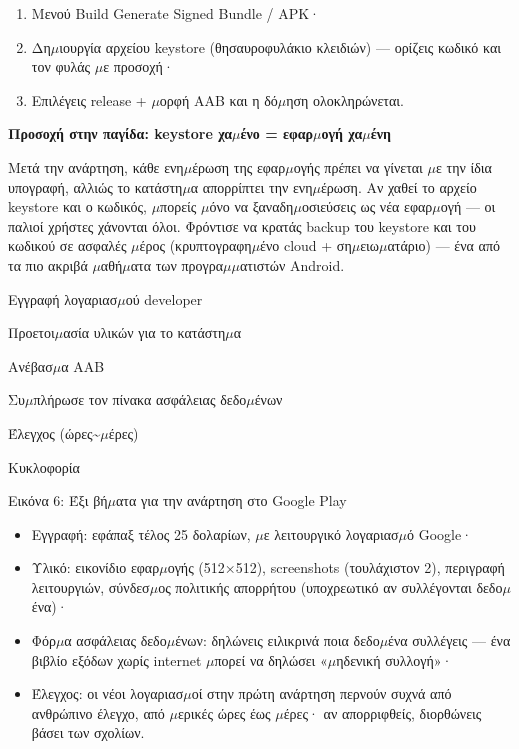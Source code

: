 \begin{enumerate}
  \item Μενού Build Generate Signed Bundle / APK·
  \item Δη$\mu$ιουργία αρχείου keystore (θησαυροφυλάκιο κλειδιών) — ορίζεις κωδικό και τον φυλάς $\mu$ε προσοχή·
  \item Επιλέγεις release + $\mu$ορφή AAB και η δό$\mu$ηση ολοκληρώνεται.
\end{enumerate}

\textbf{Προσοχή στην παγίδα: keystore χα$\mu$ένο = εφαρ$\mu$ογή χα$\mu$ένη}\par

Μετά την ανάρτηση, κάθε ενη$\mu$έρωση της εφαρ$\mu$ογής πρέπει να γίνεται $\mu$ε την ίδια υπογραφή, αλλιώς το κατάστη$\mu$α απορρίπτει την ενη$\mu$έρωση. Αν χαθεί το αρχείο keystore και ο κωδικός, $\mu$πορείς $\mu$όνο να ξαναδη$\mu$οσιεύσεις ως νέα εφαρ$\mu$ογή — οι παλιοί χρήστες χάνονται όλοι. Φρόντισε να κρατάς backup του keystore και του κωδικού σε ασφαλές $\mu$έρος (κρυπτογραφη$\mu$ένο cloud + ση$\mu$ειω$\mu$ατάριο) — ένα από τα πιο ακριβά $\mu$αθή$\mu$ατα των προγρα$\mu$$\mu$ατιστών Android.


Εγγραφή λογαριασ$\mu$ού developer

Προετοι$\mu$ασία υλικών για το κατάστη$\mu$α

Ανέβασ$\mu$α AAB

Συ$\mu$πλήρωσε τον πίνακα ασφάλειας δεδο$\mu$ένων

Έλεγχος (ώρες\textasciitilde{}$\mu$έρες)

Κυκλοφορία

\begin{center}\small\color{gray}Εικόνα 6: Έξι βή$\mu$ατα για την ανάρτηση στο Google Play\end{center}

\begin{itemize}
  \item Εγγραφή: εφάπαξ τέλος 25 δολαρίων, $\mu$ε λειτουργικό λογαριασ$\mu$ό Google·
  \item Υλικό: εικονίδιο εφαρ$\mu$ογής (512×512), screenshots (τουλάχιστον 2), περιγραφή λειτουργιών, σύνδεσ$\mu$ος πολιτικής απορρήτου (υποχρεωτικό αν συλλέγονται δεδο$\mu$ένα)·
  \item Φόρ$\mu$α ασφάλειας δεδο$\mu$ένων: δηλώνεις ειλικρινά ποια δεδο$\mu$ένα συλλέγεις — ένα βιβλίο εξόδων χωρίς internet $\mu$πορεί να δηλώσει «$\mu$ηδενική συλλογή»·
  \item Έλεγχος: οι νέοι λογαριασ$\mu$οί στην πρώτη ανάρτηση περνούν συχνά από ανθρώπινο έλεγχο, από $\mu$ερικές ώρες έως $\mu$έρες· αν απορριφθείς, διορθώνεις βάσει των σχολίων.
\end{itemize}

